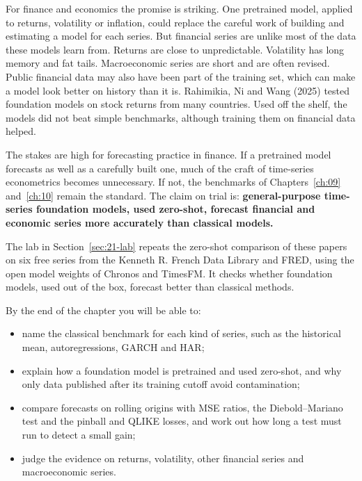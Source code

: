 For finance and economics the promise is striking. One pretrained model, applied to returns, volatility or inflation, could replace the careful work of building and estimating a model for each series. But financial series are unlike most of the data these models learn from. Returns are close to unpredictable. Volatility has long memory and fat tails. Macroeconomic series are short and are often revised. Public financial data may also have been part of the training set, which can make a model look better on history than it is. Rahimikia, Ni and Wang (2025) tested foundation models on stock returns from many countries. Used off the shelf, the models did not beat simple benchmarks, although training them on financial data helped.

The stakes are high for forecasting practice in finance. If a pretrained model forecasts as well as a carefully built one, much of the craft of time-series econometrics becomes unnecessary. If not, the benchmarks of Chapters~\ref{ch:09} and~\ref{ch:10} remain the standard. The claim on trial is: \textbf{general-purpose time-series foundation models, used zero-shot, forecast financial and economic series more accurately than classical models.}

The lab in Section~\ref{sec:21-lab} repeats the zero-shot comparison of these papers on six free series from the Kenneth R. French Data Library and FRED, using the open model weights of Chronos and TimesFM. It checks whether foundation models, used out of the box, forecast better than classical methods.

By the end of the chapter you will be able to:

\begin{itemize}
  \item name the classical benchmark for each kind of series, such as the historical mean, autoregressions, GARCH and HAR;
  \item explain how a foundation model is pretrained and used zero-shot, and why only data published after its training cutoff avoid contamination;
  \item compare forecasts on rolling origins with MSE ratios, the Diebold--Mariano test and the pinball and QLIKE losses, and work out how long a test must run to detect a small gain;
  \item judge the evidence on returns, volatility, other financial series and macroeconomic series.
\end{itemize}

